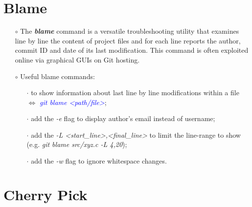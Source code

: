 \documentclass[a4paper,portrait,10pt]{article}   %
\newcommand{\mybulletlvA}{$\circ$}   %
\newcommand{\mybulletlvB}{$\cdot$}   %
\newcommand{\mydiv}{$\Leftrightarrow$ }   %
\newcommand{\mycmd}[1]{\textcolor{blue}{\textit{#1}}}   %
\newcommand{\myvspace}{\vspace{4mm}}   %
\begin{document}
\section{Blame}   \label{sec:Blame}

\begin{itemize}
\item[\mybulletlvA] The \textbf{\textit{blame}} command is a versatile troubleshooting utility that examines line by line the content of project files and for each line reports the author, commit ID and date of its last modification. This command is often exploited online via graphical GUIs on Git hosting.
\myvspace

\item[\mybulletlvA] Useful blame commands:
\begin{itemize}
  \item[\mybulletlvB] to show information about last line by line modifications within a file \mydiv \mycmd{git blame <path/file>};
  \item[\mybulletlvB] add the \textit{-e} flag to display author's email instead of username;
  \item[\mybulletlvB] add the \textit{-L <start\_line>,<final\_line>} to limit the line-range to show (e.g. \textit{git blame src/xyz.c -L 4,20});
  \item[\mybulletlvB] add the \textit{-w} flag to ignore whitespace changes.
\end{itemize}
\end{itemize}
\myvspace


\section{Cherry Pick}   \label{sec:CherryPick}
\end{document}
